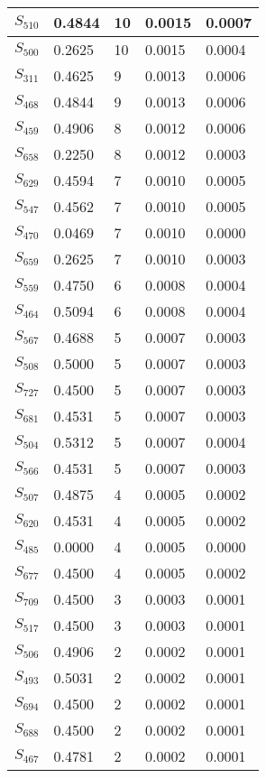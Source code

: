 \begin{xltabular}{\textwidth}{|X|X|X|X|X|}
 $S_{510}$ & 0.4844 & 10 & 0.0015 & 0.0007 \\ \hline
 $S_{500}$ & 0.2625 & 10 & 0.0015 & 0.0004 \\ \hline
 $S_{311}$ & 0.4625 & 9 & 0.0013 & 0.0006 \\ \hline
 $S_{468}$ & 0.4844 & 9 & 0.0013 & 0.0006 \\ \hline
 $S_{459}$ & 0.4906 & 8 & 0.0012 & 0.0006 \\ \hline
 $S_{658}$ & 0.2250 & 8 & 0.0012 & 0.0003 \\ \hline
 $S_{629}$ & 0.4594 & 7 & 0.0010 & 0.0005 \\ \hline
 $S_{547}$ & 0.4562 & 7 & 0.0010 & 0.0005 \\ \hline
 $S_{470}$ & 0.0469 & 7 & 0.0010 & 0.0000 \\ \hline
 $S_{659}$ & 0.2625 & 7 & 0.0010 & 0.0003 \\ \hline
 $S_{559}$ & 0.4750 & 6 & 0.0008 & 0.0004 \\ \hline
 $S_{464}$ & 0.5094 & 6 & 0.0008 & 0.0004 \\ \hline
 $S_{567}$ & 0.4688 & 5 & 0.0007 & 0.0003 \\ \hline
 $S_{508}$ & 0.5000 & 5 & 0.0007 & 0.0003 \\ \hline
 $S_{727}$ & 0.4500 & 5 & 0.0007 & 0.0003 \\ \hline
 $S_{681}$ & 0.4531 & 5 & 0.0007 & 0.0003 \\ \hline
 $S_{504}$ & 0.5312 & 5 & 0.0007 & 0.0004 \\ \hline
 $S_{566}$ & 0.4531 & 5 & 0.0007 & 0.0003 \\ \hline
 $S_{507}$ & 0.4875 & 4 & 0.0005 & 0.0002 \\ \hline
 $S_{620}$ & 0.4531 & 4 & 0.0005 & 0.0002 \\ \hline
 $S_{485}$ & 0.0000 & 4 & 0.0005 & 0.0000 \\ \hline
 $S_{677}$ & 0.4500 & 4 & 0.0005 & 0.0002 \\ \hline
 $S_{709}$ & 0.4500 & 3 & 0.0003 & 0.0001 \\ \hline
 $S_{517}$ & 0.4500 & 3 & 0.0003 & 0.0001 \\ \hline
 $S_{506}$ & 0.4906 & 2 & 0.0002 & 0.0001 \\ \hline
 $S_{493}$ & 0.5031 & 2 & 0.0002 & 0.0001 \\ \hline
 $S_{694}$ & 0.4500 & 2 & 0.0002 & 0.0001 \\ \hline
 $S_{688}$ & 0.4500 & 2 & 0.0002 & 0.0001 \\ \hline
 $S_{467}$ & 0.4781 & 2 & 0.0002 & 0.0001 \\ \hline

\end{xltabular}
